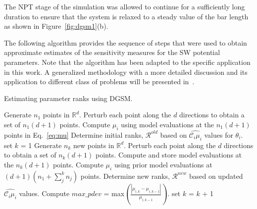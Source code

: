 \noindent The NPT stage of the simulation was allowed to continue for a sufficiently long duration to ensure
that the system is relaxed to a steady value of the bar length as shown in Figure~\ref{fig:dgsm1}(b).

The following algorithm provides the sequence of steps that were used to obtain approximate estimates of the
sensitivity measures for the SW potential parameters. Note that the algorithm has been adapted to the 
specific application in this work. A generalized methodology with a more detailed discussion and its application
to different class of problems will be presented in~\cite{Vohra:2018}.

\bigskip

\begin{breakablealgorithm}
  \caption{Estimating parameter ranks using DGSM.}
  \begin{algorithmic}[1]
      \State Generate $n_1$ points in $\mathbb{R}^{d}$.
      \State Perturb each point along the $d$ directions to obtain a set of $n_1(d+1)$ points.
      \State Compute $\mu_i$ using model evaluations at the $n_1(d+1)$ points in Eq.~\ref{eq:mu}
      \State Determine initial ranks, $\mathcal{R}^{old}$ based on $\hat{\mathcal{C}_i\mu_i}$ values for $\theta_i$.
      \State set $k$ = 1
      \Do
        \State Generate $n_k$ new points in $\mathbb{R}^{d}$.
        \State Perturb each point along the $d$ directions to obtain a set of $n_k(d+1)$ points.
        \State Compute and store model evaluations at the $n_k(d+1)$ points.
        \State Compute $\mu_i$ using prior model evaluations at $(d+1)(n_1 + \sum_j^k n_j)$ points.
        \State Determine new ranks, $\mathcal{R}^{new}$ based on updated $\hat{\mathcal{C}_i\mu_i}$ values.
        \State Compute $max\_pdev$ = max$\left(\frac{|\mu_{i,k} - 
               \mu_{i,k-1}|}{ \mu_{i,k-1}}\right)$.
        \State set $k$ = $k$ + 1
    \EndProcedure
  \end{algorithmic}
\end{breakablealgorithm}

\bigskip

